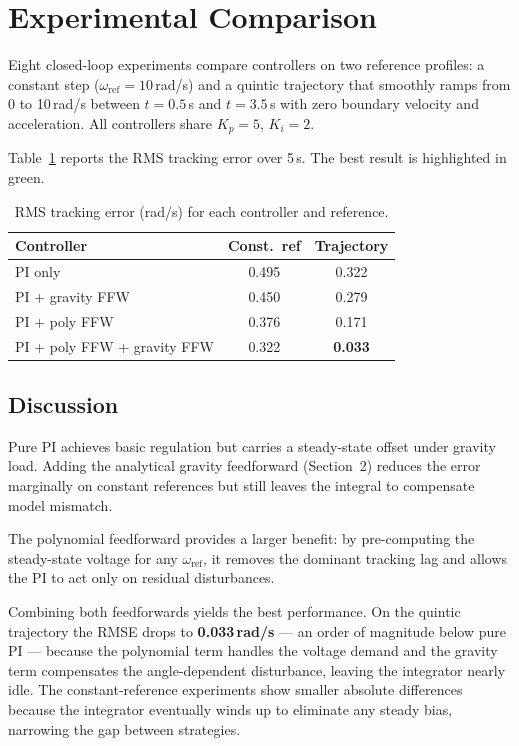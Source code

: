 \documentclass[10pt,twocolumn]{article}
\begin{document}
\section{Experimental Comparison}

Eight closed-loop experiments compare controllers on two reference
profiles: a constant step ($\omega_{\mathrm{ref}}=10$\,rad/s) and a
quintic trajectory that smoothly ramps from 0 to 10\,rad/s between
$t=0.5$\,s and $t=3.5$\,s with zero boundary velocity and
acceleration. All controllers share $K_p=5$, $K_i=2$.

Table~\ref{tab:results} reports the RMS tracking error over 5\,s.
The best result is highlighted in green.

\begin{table}[h]
\centering
\caption{RMS tracking error (rad/s) for each controller and reference.}
\label{tab:results}
\begin{tabular}{lcc}
\toprule
\textbf{Controller} & \textbf{Const.\ ref} & \textbf{Trajectory}\\
\midrule
PI only                        & 0.495 & 0.322 \\
PI + gravity FFW               & 0.450 & 0.279 \\
PI + poly FFW                  & 0.376 & 0.171 \\
\rowcolor{bestrow}
PI + poly FFW + gravity FFW    & 0.322 & \textbf{0.033} \\
\bottomrule
\end{tabular}
\end{table}

\subsection{Discussion}
Pure PI achieves basic regulation but carries a steady-state offset
under gravity load. Adding the analytical gravity feedforward
(Section~2) reduces the error marginally on constant
references but still leaves the integral to compensate model mismatch.

The polynomial feedforward provides a larger benefit: by pre-computing
the steady-state voltage for any $\omega_{\mathrm{ref}}$, it removes
the dominant tracking lag and allows the PI to act only on residual
disturbances.

Combining both feedforwards yields the best performance. On the quintic
trajectory the RMSE drops to \textbf{0.033\,rad/s} --- an order of
magnitude below pure PI --- because the polynomial term handles the
voltage demand and the gravity term compensates the angle-dependent
disturbance, leaving the integrator nearly idle. The constant-reference
experiments show smaller absolute differences because the integrator
eventually winds up to eliminate any steady bias, narrowing the gap
between strategies.
\end{document}
